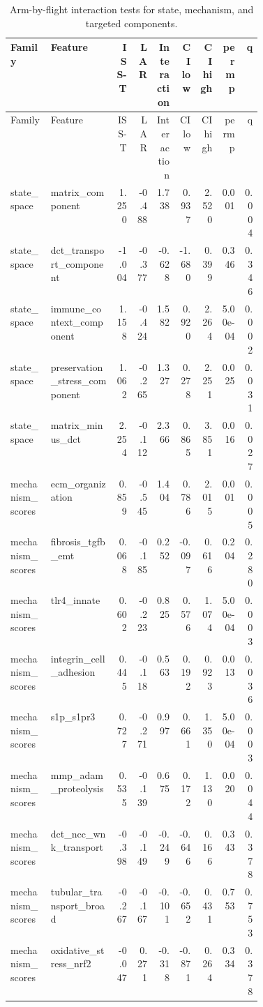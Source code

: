 \documentclass[11pt]{article}
\begin{document}
\begin{landscape}
\scriptsize
\setlength{\tabcolsep}{3pt}
\begin{longtable}{p{0.16\linewidth}p{0.26\linewidth}rrrrrrr}
\caption{Arm-by-flight interaction tests for state, mechanism, and targeted components.}\\
\toprule
Family & Feature & ISS-T & LAR & Interaction & CI low & CI high & perm p & q \\
\midrule
\endfirsthead
\toprule
Family & Feature & ISS-T & LAR & Interaction & CI low & CI high & perm p & q \\
\midrule
\endhead
state\_space & matrix\_component & 1.250 & -0.488 & 1.738 & 0.937 & 2.520 & 0.001 & 0.004 \\
state\_space & dct\_transport\_component & -1.004 & -0.377 & -0.628 & -1.680 & 0.399 & 0.346 & 0.346 \\
state\_space & immune\_context\_component & 1.158 & -0.424 & 1.582 & 0.920 & 2.264 & 5.00e-04 & 0.002 \\
state\_space & preservation\_stress\_component & 1.062 & -0.265 & 1.327 & 0.278 & 2.251 & 0.025 & 0.031 \\
state\_space & matrix\_minus\_dct & 2.254 & -0.112 & 2.366 & 0.865 & 3.851 & 0.016 & 0.027 \\
mechanism\_scores & ecm\_organization & 0.859 & -0.545 & 1.404 & 0.786 & 2.015 & 0.001 & 0.005 \\
mechanism\_scores & fibrosis\_tgfb\_emt & 0.068 & -0.185 & 0.252 & -0.097 & 0.616 & 0.204 & 0.280 \\
mechanism\_scores & tlr4\_innate & 0.602 & -0.223 & 0.825 & 0.576 & 1.074 & 5.00e-04 & 0.003 \\
mechanism\_scores & integrin\_cell\_adhesion & 0.445 & -0.118 & 0.563 & 0.192 & 0.923 & 0.013 & 0.036 \\
mechanism\_scores & s1p\_s1pr3 & 0.727 & -0.271 & 0.997 & 0.661 & 1.350 & 5.00e-04 & 0.003 \\
mechanism\_scores & mmp\_adam\_proteolysis & 0.535 & -0.139 & 0.675 & 0.172 & 1.130 & 0.020 & 0.044 \\
mechanism\_scores & dct\_ncc\_wnk\_transport & -0.398 & -0.149 & -0.249 & -0.646 & 0.166 & 0.343 & 0.378 \\
mechanism\_scores & tubular\_transport\_broad & -0.267 & -0.167 & -0.101 & -0.652 & 0.431 & 0.753 & 0.753 \\
mechanism\_scores & oxidative\_stress\_nrf2 & -0.047 & 0.271 & -0.318 & -0.871 & 0.264 & 0.334 & 0.378 \\

\end{longtable}
\end{landscape}
\end{document}
